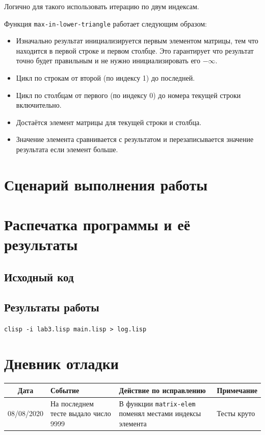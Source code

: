 \documentclass[12pt]{article}
\begin{document}
Логично для такого использовать итерацию по двум индексам.

Функция {\tt max-in-lower-triangle} работает следующим образом:
\begin{itemize}
\setlength{\itemsep}{-1mm} %
\item Изначально результат инициализируется первым элементом матрицы, тем что находится в первой
  строке и первом столбце. Это гарантирует что результат точно будет правильным и не нужно
  инициализировать его $-\infty$.
\item Цикл по строкам от второй (по индексу 1) до последней.
\item Цикл по столбцам от первого (по индексу 0) до номера текущей строки включительно.
\item Достаётся элемент матрицы для текущей строки и столбца.
\item Значение элемента сравнивается с результатом и перезаписывается значение результата если
  элемент больше.
\end{itemize}
\section{Сценарий выполнения работы}
\section{Распечатка программы и её результаты}

\subsection{Исходный код}

\subsection{Результаты работы}
\lstinline{clisp -i lab3.lisp main.lisp > log.lisp}

\section{Дневник отладки}
\noindent
\begin{tabularx}{\linewidth}{|c|X|X|X|}
\hline
Дата & Событие & Действие по исправлению & Примечание \\
\hline
08/08/2020 & На последнем тесте выдало число 9999 & В функции {\tt matrix-elem} поменял местами индексы элемента & Тесты круто \\
\hline
\end{tabularx}
\end{document}
